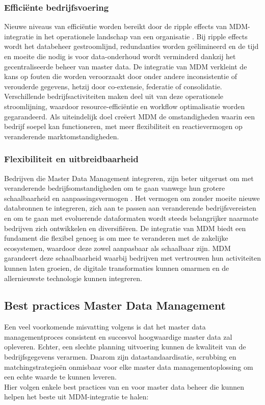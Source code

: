 \subsubsection{Efficiënte bedrijfsvoering }

Nieuwe niveaus van efficiëntie worden bereikt door de ripple effects van MDM-integratie in het operationele landschap van een organisatie \autocite{Pansara2024}. Bij ripple effects wordt het databeheer gestroomlijnd, redundanties worden geëlimineerd en de tijd en moeite die nodig is voor data-onderhoud wordt verminderd dankzij het gecentraliseerde beheer van master data. De integratie van MDM verkleint de kans op fouten die worden veroorzaakt door onder andere inconsistentie of verouderde gegevens, hetzij door co-extensie, federatie of consolidatie. Verschillende bedrijfsactiviteiten maken deel uit van deze operationele stroomlijning, waardoor resource-efficiëntie en workflow optimalisatie worden gegarandeerd. Als uiteindelijk doel creëert MDM de omstandigheden waarin een bedrijf soepel kan functioneren, met meer flexibiliteit en reactievermogen op veranderende marktomstandigheden.

\subsubsection{Flexibiliteit en uitbreidbaarheid}
Bedrijven die Master Data Management integreren, zijn beter uitgerust om met veranderende bedrijfsomstandigheden om te gaan vanwege hun grotere schaalbaarheid en aanpassingsvermogen \autocite{Pansara2024}. Het vermogen om zonder moeite nieuwe databronnen te integreren, zich aan te passen aan veranderende bedrijfsvereisten en om te gaan met evoluerende dataformaten wordt steeds belangrijker naarmate bedrijven zich ontwikkelen en diversifiëren. De integratie van MDM biedt een fundament die flexibel genoeg is om mee te veranderen met de zakelijke ecosystemen, waardoor deze zowel aanpasbaar als schaalbaar zijn. MDM garandeert deze schaalbaarheid waarbij bedrijven met vertrouwen hun activiteiten kunnen laten groeien, de digitale transformaties kunnen omarmen en de allernieuwste technologie kunnen integreren.

\subsection{Best practices Master Data Management}
Een veel voorkomende misvatting volgens \textcite{Raghavendra2023} is dat het master data managementproces consistent en succesvol hoogwaardige master data zal opleveren. Echter, een slechte planning uitvoering kunnen de kwaliteit van de bedrijfsgegevens verarmen. Daarom zijn datastandaardisatie, scrubbing en matchingstrategieën onmisbaar voor elke master data managementoplossing om een echte waarde te kunnen leveren.
\\Hier volgen enkele best practices van \textcite{Raghavendra2023} en \textcite{Sharma2023} voor master data beheer die kunnen helpen het beste uit MDM-integratie te halen:

